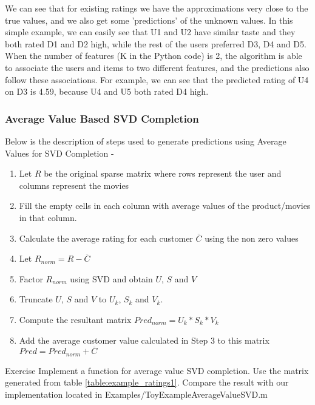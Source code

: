  We can see that for existing ratings we have the approximations very close to the true values, and we also get some 'predictions' of the unknown values. In this simple example, we can easily see that U1 and U2 have similar taste and they both rated D1 and D2 high, while the rest of the users preferred D3, D4 and D5. When the number of features (K in the Python code) is 2, the algorithm is able to associate the users and items to two different features, and the predictions also follow these associations. For example, we can see that the predicted rating of U4 on D3 is 4.59, because U4 and U5 both rated D4 high.

  \subsubsection{Average Value Based SVD Completion}
  Below is the description of steps used to generate predictions using Average Values for SVD Completion -
  \begin{enumerate}
    \item Let $R$ be the original sparse matrix where rows represent the user and columns represent the movies
    \item Fill the empty cells in each column with average values of the product/movies in that column.
    \item Calculate the average rating for each customer $\overline{C}$ using the non zero values
    \item Let $R_{norm} = R - \overline{C}$  
    \item Factor $R_{norm}$ using SVD and obtain $U$, $S$ and $V$
    \item Truncate $U$, $S$ and $V$ to $U_k$, $S_k$ and $V_k$.
    \item Compute the resultant matrix $Pred_{norm} = U_k*S_k*V_k$
    \item Add the average customer value calculated in Step 3 to this matrix $Pred = Pred_{norm} + \overline{C} $
  \end{enumerate}
\begin{myremark}{Exercise }
Implement a function for average value SVD completion. Use the matrix generated from table \ref{table:example_ratings1}. Compare the result with our implementation located in Examples/ToyExampleAverageValueSVD.m
\end{myremark}
